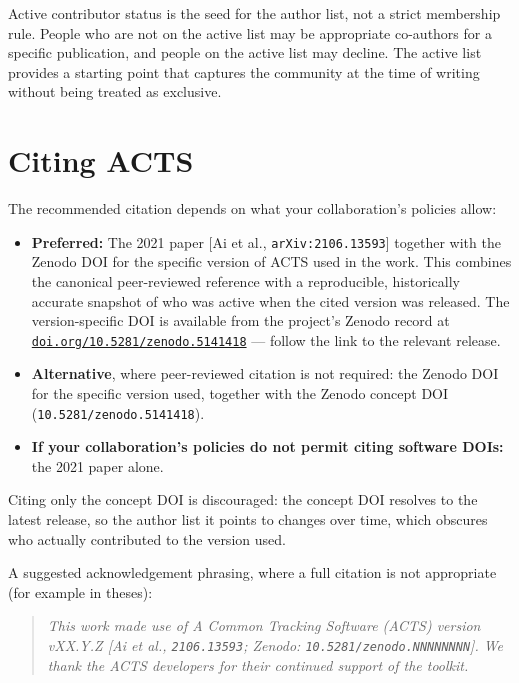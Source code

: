 \documentclass[11pt,a4paper]{article}
\begin{document}
Active contributor status is the seed for the author list, not a strict membership
rule. People who are not on the active list may be appropriate co-authors for a
specific publication, and people on the active list may decline. The active list
provides a starting point that captures the community at the time of writing
without being treated as exclusive.

\section*{Citing ACTS}

The recommended citation depends on what your collaboration's policies allow:

\begin{itemize}
    \item \textbf{Preferred:} The 2021 paper [Ai et al., \texttt{arXiv:2106.13593}]
          together with the Zenodo DOI for the specific version of ACTS used in the
          work. This combines the canonical peer-reviewed reference with a
          reproducible, historically accurate snapshot of who was active when the
          cited version was released. The version-specific DOI is available from
          the project's Zenodo record at
          \href{https://doi.org/10.5281/zenodo.5141418}{\texttt{doi.org/10.5281/zenodo.5141418}}
          --- follow the link to the relevant release.
    \item \textbf{Alternative}, where peer-reviewed citation is not required: the
          Zenodo DOI for the specific version used, together with the Zenodo
          concept DOI (\texttt{10.5281/zenodo.5141418}).
    \item \textbf{If your collaboration's policies do not permit citing software
          DOIs:} the 2021 paper alone.
\end{itemize}

Citing only the concept DOI is discouraged: the concept DOI resolves to the latest
release, so the author list it points to changes over time, which obscures who
actually contributed to the version used.

A suggested acknowledgement phrasing, where a full citation is not appropriate (for
example in theses):

\begin{quote}
\itshape
This work made use of A Common Tracking Software (ACTS) version vXX.Y.Z [Ai et al.,
\texttt{2106.13593}; Zenodo: \texttt{10.5281/zenodo.NNNNNNNN}]. We thank the ACTS
developers for their continued support of the toolkit.
\end{quote}
\end{document}
